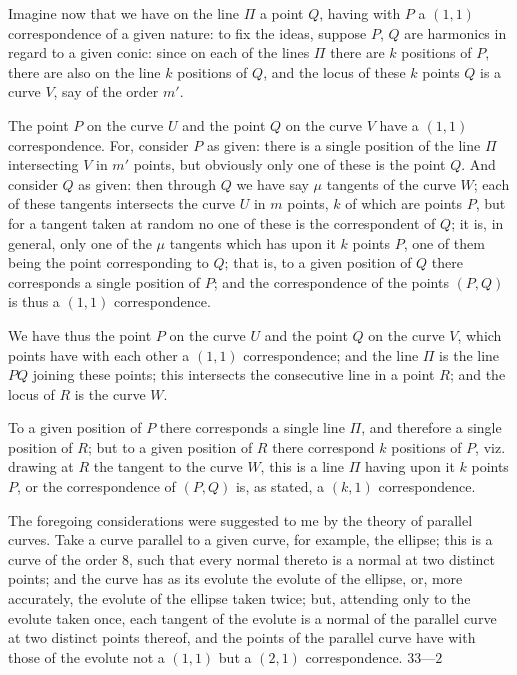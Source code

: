 \documentclass[11pt,a4paper]{book}
\begin{document}
Imagine now that we have on the line $\Pi$ a point $Q$, having with $P$ a $(1,1)$ correspondence of a given nature: to fix the ideas, suppose $P$, $Q$ are harmonics in regard to a given conic: since on each of the lines $\Pi$ there are $k$ positions of $P$, there are also on the line $k$ positions of $Q$, and the locus of these $k$ points $Q$ is a curve $V$, say of the order $m'$.

The point $P$ on the curve $U$ and the point $Q$ on the curve $V$ have a $(1,1)$ correspondence. For, consider $P$ as given: there is a single position of the line $\Pi$ intersecting $V$ in $m'$ points, but obviously only one of these is the point $Q$. And consider $Q$ as given: then through $Q$ we have say $\mu$ tangents of the curve $W$; each of these tangents intersects the curve $U$ in $m$ points, $k$ of which are points $P$, but for a tangent taken at random no one of these is the correspondent of $Q$; it is, in general, only one of the $\mu$ tangents which has upon it $k$ points $P$, one of them being the point corresponding to $Q$; that is, to a given position of $Q$ there corresponds a single position of $P$; and the correspondence of the points $(P, Q)$ is thus a $(1,1)$ correspondence.

We have thus the point $P$ on the curve $U$ and the point $Q$ on the curve $V$, which points have with each other a $(1,1)$ correspondence; and the line $\Pi$ is the line $PQ$ joining these points; this intersects the consecutive line in a point $R$; and the locus of $R$ is the curve $W$.

To a given position of $P$ there corresponds a single line $\Pi$, and therefore a single position of $R$; but to a given position of $R$ there correspond $k$ positions of $P$, viz. drawing at $R$ the tangent to the curve $W$, this is a line $\Pi$ having upon it $k$ points $P$, or the correspondence of $(P, Q)$ is, as stated, a $(k,1)$ correspondence.

The foregoing considerations were suggested to me by the theory of parallel curves. Take a curve parallel to a given curve, for example, the ellipse; this is a curve of the order 8, such that every normal thereto is a normal at two distinct points; and the curve has as its evolute the evolute of the ellipse, or, more accurately, the evolute of the ellipse taken twice; but, attending only to the evolute taken once, each tangent of the evolute is a normal of the parallel curve at two distinct points thereof, and the points of the parallel curve have with those of the evolute not a $(1,1)$ but a $(2,1)$ correspondence.
\hfill $33\text{---}2$
\end{document}
